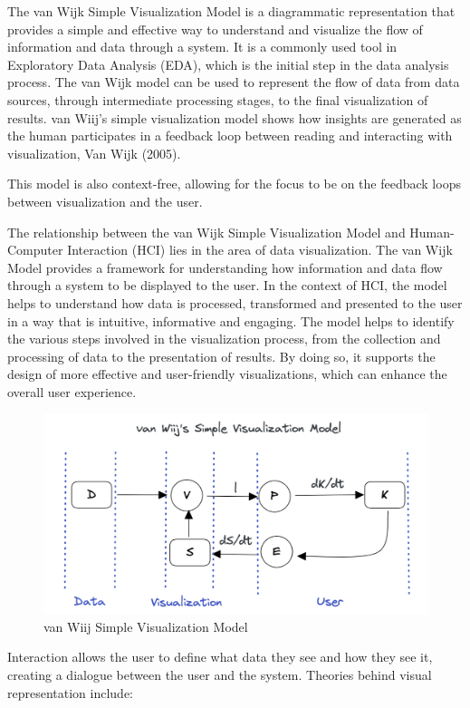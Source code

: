 \documentclass[print]{nuthesis}
\begin{document}
The van Wijk Simple Visualization Model is a diagrammatic representation that provides a simple and effective way to understand and visualize the flow of information and data through a system.
It is a commonly used tool in Exploratory Data Analysis (EDA), which is the initial step in the data analysis process.
The van Wijk model can be used to represent the flow of data from data sources, through intermediate processing stages, to the final visualization of results.
van Wiij's simple visualization model shows how insights are generated as the human participates in a feedback loop between reading and interacting with visualization, Van Wijk (2005).

This model is also context-free, allowing for the focus to be on the feedback loops between visualization and the user.

The relationship between the van Wijk Simple Visualization Model and Human-Computer Interaction (HCI) lies in the area of data visualization.
The van Wijk Model provides a framework for understanding how information and data flow through a system to be displayed to the user.
In the context of HCI, the model helps to understand how data is processed, transformed and presented to the user in a way that is intuitive, informative and engaging.
The model helps to identify the various steps involved in the visualization process, from the collection and processing of data to the presentation of results.
By doing so, it supports the design of more effective and user-friendly visualizations, which can enhance the overall user experience.

\begin{figure}

{\centering \includegraphics[width=0.45\linewidth]{figure/vanWiijSimpleModel} 

}

\caption{van Wiij Simple Visualization Model}\label{fig:vanWiijmodel}
\end{figure}

Interaction allows the user to define what data they see and how they see it, creating a dialogue between the user and the system.
Theories behind visual representation include:
\end{document}

